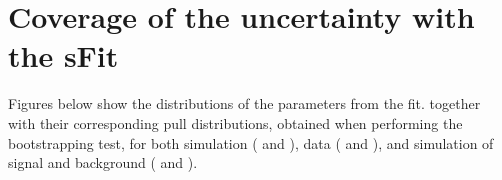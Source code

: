 \cleardoublepage
\chapter{Coverage of the uncertainty with the sFit}
\label{app:Bootstrapping}

Figures below show the distributions of the parameters from the fit. together with their corresponding pull distributions, obtained when performing the bootstrapping test, for both simulation ( and ), data ( and ), and simulation of signal and background ( and ).

